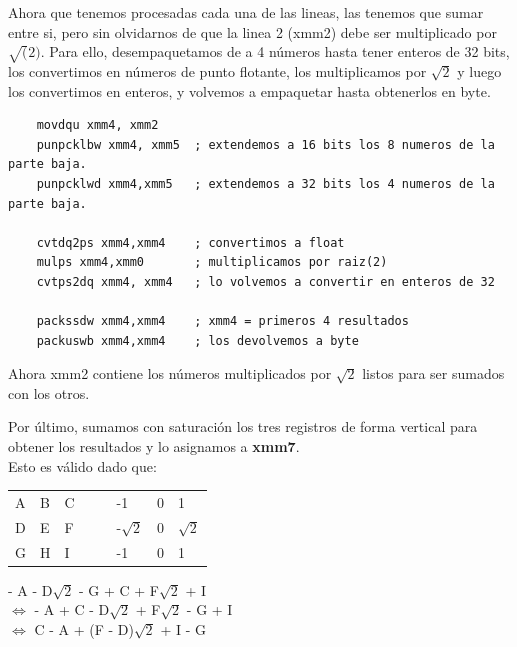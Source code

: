 \documentclass[a4paper, 10pt]{article}
\begin{document}
Ahora que tenemos procesadas cada una de las lineas, las tenemos que sumar entre si, pero sin olvidarnos de que la linea 2 (xmm2) debe ser multiplicado por $\sqrt(2)$.
Para ello, desempaquetamos de a 4 n\'umeros hasta tener enteros de 32 bits, los convertimos en n\'umeros de punto flotante, los multiplicamos por $\sqrt{2}$ y luego los convertimos en enteros, y volvemos a empaquetar hasta obtenerlos en byte. \\


\lstset{language=[x86masm]Assembler}
\begin{lstlisting}
	movdqu xmm4, xmm2
	punpcklbw xmm4, xmm5  ; extendemos a 16 bits los 8 numeros de la parte baja.
	punpcklwd xmm4,xmm5   ; extendemos a 32 bits los 4 numeros de la parte baja.

	cvtdq2ps xmm4,xmm4    ; convertimos a float		
	mulps xmm4,xmm0       ; multiplicamos por raiz(2)
	cvtps2dq xmm4, xmm4   ; lo volvemos a convertir en enteros de 32

	packssdw xmm4,xmm4    ; xmm4 = primeros 4 resultados
	packuswb xmm4,xmm4    ; los devolvemos a byte
\end{lstlisting}

\newpage

Ahora xmm2 contiene los n\'umeros multiplicados por $\sqrt{2}$ listos para ser sumados con los otros.

Por \'ultimo, sumamos con saturaci\'on los tres registros de forma vertical para obtener los resultados y lo asignamos a \textbf{xmm7}. \\ 

Esto es v\'alido dado que:
\begin{center}
	\begin{tabular}{llllllll}
		A & B & C & & & -1 & 0 & 1 \\
		D & E & F & & & -$\sqrt{2}$ & 0 & $\sqrt{2}$ \\
		G & H & I & & & -1 & 0 & 1 \\
	\end{tabular}
\end{center}

\begin{center}
	\entonces - A - D$\sqrt{2}$ - G + C + F$\sqrt{2}$ + I \\
	$\Leftrightarrow$ - A + C - D$\sqrt{2}$ + F$\sqrt{2}$ - G + I \\
	$\Leftrightarrow$ C - A + (F - D)$\sqrt{2}$ + I - G \\ 
\end{center} 
\end{document}
